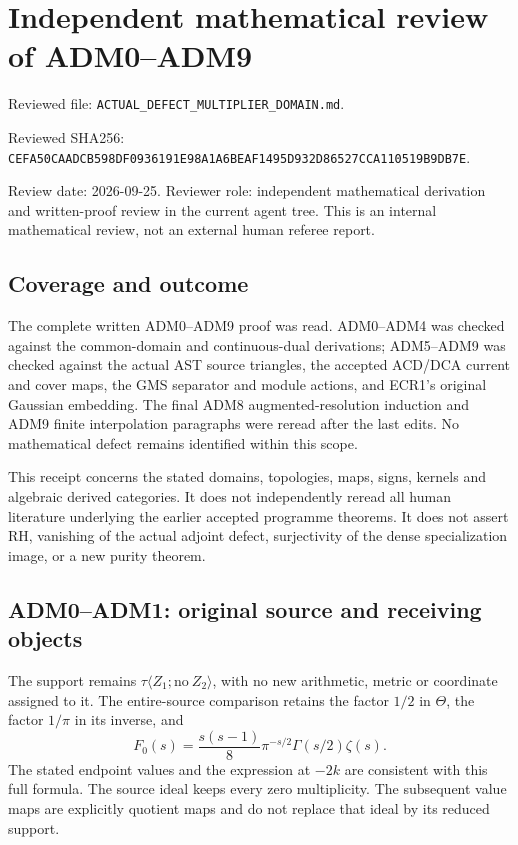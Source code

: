 \section{Independent mathematical review of
ADM0--ADM9}\label{independent-mathematical-review-of-adm0adm9}

Reviewed file: \nolinkurl{ACTUAL_DEFECT_MULTIPLIER_DOMAIN.md}.

Reviewed SHA256:
\nolinkurl{CEFA50CAADCB598DF0936191E98A1A6BEAF1495D932D86527CCA110519B9DB7E}.

Review date: 2026-09-25. Reviewer role: independent mathematical
derivation and written-proof review in the current agent tree. This is
an internal mathematical review, not an external human referee report.

\subsection{Coverage and outcome}\label{coverage-and-outcome}

The complete written ADM0--ADM9 proof was read. ADM0--ADM4 was checked
against the common-domain and continuous-dual derivations; ADM5--ADM9
was checked against the actual AST source triangles, the accepted
ACD/DCA current and cover maps, the GMS separator and module actions,
and ECR1's original Gaussian embedding. The final ADM8
augmented-resolution induction and ADM9 finite interpolation paragraphs
were reread after the last edits. No mathematical defect remains
identified within this scope.

This receipt concerns the stated domains, topologies, maps, signs,
kernels and algebraic derived categories. It does not independently
reread all human literature underlying the earlier accepted programme
theorems. It does not assert RH, vanishing of the actual adjoint defect,
surjectivity of the dense specialization image, or a new purity theorem.

\subsection{ADM0--ADM1: original source and receiving
objects}\label{adm0adm1-original-source-and-receiving-objects}

The support remains \(\tau\langle Z_1;\mathrm{no}\ Z_2\rangle\), with no
new arithmetic, metric or coordinate assigned to it. The entire-source
comparison retains the factor \(1/2\) in \(\Theta\), the factor
\(1/\pi\) in its inverse, and \[
F_0(s)=\frac{s(s-1)}8\pi^{-s/2}\Gamma(s/2)\zeta(s).
\] The stated endpoint values and the expression at \(-2k\) are
consistent with this full formula. The source ideal keeps every zero
multiplicity. The subsequent value maps are explicitly quotient maps and
do not replace that ideal by its reduced support.

